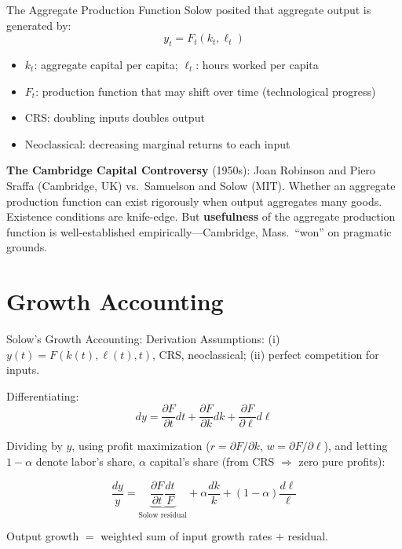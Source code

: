 \documentclass[blue]{beamer}
\begin{document}
\begin{frame}{The Aggregate Production Function}
	Solow posited that aggregate output is generated by:
	\[
	y_t = F_t(k_t, \ell_t)
	\]
		\vspace{-27pt}
	\begin{itemize}
		\item $k_t$: aggregate capital per capita; $\ell_t$: hours worked per capita
		\item $F_t$: production function that may shift over time (technological progress)
		\item CRS: doubling inputs doubles output
		\item Neoclassical: decreasing marginal returns to each input
	\end{itemize}
	
	\textbf{The Cambridge Capital Controversy} (1950s): Joan Robinson and Piero Sraffa (Cambridge, UK) vs.\ Samuelson and Solow (MIT). Whether an aggregate production function can exist rigorously when output aggregates many goods. Existence conditions are knife-edge. But \textbf{usefulness} of the aggregate production function is well-established empirically---Cambridge, Mass.\ ``won'' on pragmatic grounds.
\end{frame}

\section{Growth Accounting}

\begin{frame}{Solow's Growth Accounting: Derivation}
	Assumptions: (i) $y(t) = F(k(t), \ell(t), t)$, CRS, neoclassical; (ii) perfect competition for inputs.
	
	\bigskip
	Differentiating:
	\[
	dy = \frac{\partial F}{\partial t}dt + \frac{\partial F}{\partial k}dk + \frac{\partial F}{\partial \ell}d\ell
	\]
	
	Dividing by $y$, using profit maximization ($r = \partial F/\partial k$, $w = \partial F/\partial \ell$), and letting $1 - \alpha$ denote labor's share, $\alpha$ capital's share (from CRS $\Rightarrow$ zero pure profits):
	
	\[
	\frac{dy}{y} = \underbrace{\frac{\partial F}{\partial t}\frac{dt}{F}}_{\text{Solow residual}} + \alpha \frac{dk}{k} + (1-\alpha)\frac{d\ell}{\ell}
	\]
	
	Output growth $=$ weighted sum of input growth rates $+$ residual.
\end{frame}
\end{document}
